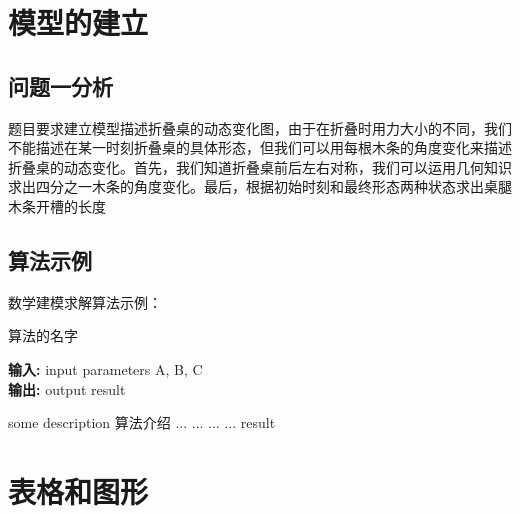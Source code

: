 \documentclass[bwprint,fontset=windows]{gmcmthesis}
\begin{document}


\section{模型的建立}

\subsection{问题一分析}
题目要求建立模型描述折叠桌的动态变化图，由于在折叠时用力大小的不同，我们不能描述在某一时刻折叠桌的具体形态，但我们可以用每根木条的角度变化来描述折叠桌的动态变化。首先，我们知道折叠桌前后左右对称，我们可以运用几何知识求出四分之一木条的角度变化。最后，根据初始时刻和最终形态两种状态求出桌腿木条开槽的长度


\subsection{算法示例}

数学建模求解算法示例：
\begin{center}
\begin{minipage}{0.8\textwidth}
\begin{algorithm}[H]%
\caption{算法的名字} %
{\bf 输入:} %
input parameters A, B, C\\
{\bf 输出:} %
output result
\begin{algorithmic}[1]
\State some description 算法介绍 %
  \State ...
    \State ...
  \Else
    \State ...
  \EndIf
\EndFor
{} %
  \State ...
\EndWhile
\State \Return result
\end{algorithmic}
\end{algorithm}
\end{minipage}
\end{center}
\vspace{2ex}

\section{表格和图形}
\end{document}
